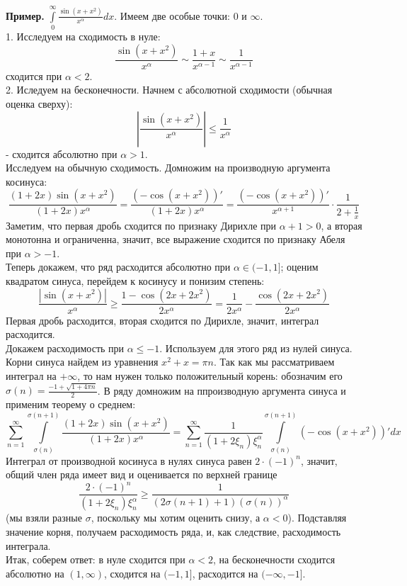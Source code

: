 \textbf{Пример.} $\int\limits_{0}^{\infty}\frac{\sin(x+x^2)}{x^\alpha}dx$.
Имеем две особые точки: $0$ и  $\infty$.\\
1. Исследуем на сходимость в нуле:
$$\frac{\sin(x+x^2)}{x^\alpha}\sim \frac{1+x}{x^{\alpha-1}}\sim
\frac{1}{x^{\alpha-1}}$$
сходится при $\alpha<2$.\\
2. Иследуем на бесконечности. Начнем с абсолютной сходимости (обычная оценка
сверху):
$$\left|\frac{\sin(x+x^2)}{x^\alpha}\right|\leqslant \frac{1}{x^\alpha}$$
- сходится абсолютно при $\alpha>1$.\\
Исследуем на обычную сходимость. Домножим на производную аргумента косинуса:
$$\frac{(1+2x)\sin(x+x^2)}{(1+2x)x^\alpha}=
\frac{(-\cos(x+x^2))'}{(1+2x)x^{\alpha}}=\frac{(-\cos(x+x^2))'}{x^{\alpha+1}}
\cdot \frac{1}{2+\frac{1}{x}}$$
Заметим, что первая дробь сходится по признаку Дирихле при 
$\alpha+1>0$, 
а вторая монотонна и ограниченна, значит, все выражение сходится по 
признаку Абеля при $\alpha>-1$.\\
Теперь докажем, что ряд расходится абсолютно при $\alpha\in (-1,1]$;
оценим квадратом синуса, перейдем к косинусу и понизим степень:
$$\frac{|\sin(x+x^2)|}{x^{\alpha}}\geqslant \frac{1-\cos(2x+2x^2)}{2x^\alpha}=
\frac{1}{2x^\alpha}-\frac{\cos(2x+2x^2)}{2x^\alpha}$$
Первая дробь расходится, вторая сходится по Дирихле, значит, интеграл 
расходится.\\
Докажем расходимость при $\alpha\leqslant-1$. Используем для этого ряд из
нулей синуса. Корни синуса найдем из уравнения $x^2+x=\pi n$. Так как мы 
рассматриваем интеграл на $+\infty$, то нам нужен 
только положительный корень: обозначим его
$\sigma(n)=\frac{-1+\sqrt{1+4\pi n}}{2}$. В ряду домножим на ппроизводную
аргумента синуса и применим теорему о среднем:
$$\sum\limits_{n=1}^{\infty} \int\limits_{\sigma(n)}^{\sigma(n+1)}
\frac{(1+2x)\sin(x+x^2)}{(1+2x)x^{\alpha}}=\sum\limits_{n=1}^{\infty} 
\frac{1}{(1+2\xi_n)\xi_n^\alpha}\int\limits_{\sigma(n)}^{\sigma(n+1)}
(-\cos(x+x^2))'dx$$
Интеграл от производной косинуса в нулях синуса равен $2\cdot (-1)^n$, 
значит, общий член ряда имеет вид и оценивается по верхней границе
$$\frac{2\cdot (-1)^n}{(1+2\xi_n)\xi_n^\alpha}\geqslant
\frac{1}{(2\sigma(n+1)+1)(\sigma(n))^\alpha}$$
(мы взяли разные $\sigma$, поскольку мы хотим оценить снизу, а $\alpha<0$).
Подставляя значение корня, получаем расходимость ряда, и, как следствие,
расходимость интеграла.\\
Итак, соберем ответ: в нуле сходится при $\alpha<2$, на бесконечности 
сходится абсолютно на $(1,\infty)$, сходится на $(-1,1]$,
расходится на $(-\infty,-1]$. 


